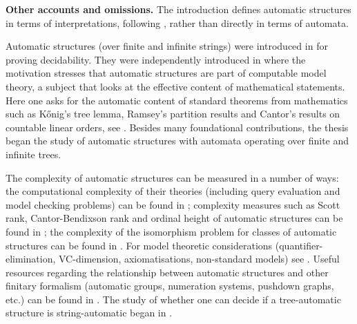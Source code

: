 {\bf Other accounts and omissions.} 
The introduction defines automatic structures in terms of interpretations, following  \cite{Blum99,BlGr00,CoLo07}, rather than directly in terms of automata.

Automatic structures (over finite and infinite strings) were introduced in \cite{Hodg76,Hodg83} for proving decidability. They were independently introduced in \cite{KhNe95} where the motivation stresses that automatic structures are part of computable model theory, a subject that looks at the effective content of mathematical statements. Here one asks for the automatic content of standard theorems from mathematics such as K\H{o}nig's tree lemma, Ramsey's partition results and Cantor's results on countable linear orders, see \cite{Rubi08,Kusk03,Kusk10,KuLo10,HuLi13}. Besides many foundational contributions, the thesis \cite{Blum99} began the study of automatic structures with automata operating over finite and infinite trees. 



The complexity of automatic structures can be measured in a number of ways: the computational complexity of their theories (including query evaluation and model checking problems) can be found in  \cite{BlGr00,Kusk09,KuLo11,BaGrRu11,KuWe11}; complexity measures such as Scott rank, Cantor-Bendixson rank and ordinal height of automatic structures can be found in \cite{KRS05,KhMi09,Husc13,HKLL13}; the complexity of the isomorphism problem for classes of automatic structures can be found in \cite{Rubi08,KLL10LICS,KLL13,Kuske14}. For model theoretic considerations (quantifier-elimination, VC-dimension, axiomatisations, non-standard models) see \cite{Blum99,BLSS03,BaGrRu11}. Useful resources regarding the relationship between automatic structures and other finitary formalism (automatic groups, numeration systems, pushdown graphs, etc.) can be found in \cite{BlGr00,BaGrRu11,Kart13}. The study of whether one can decide if a tree-automatic structure is string-automatic began in \cite{Husc12}. 

